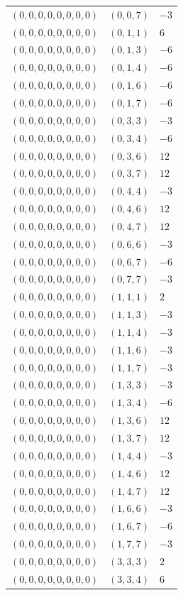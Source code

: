 \begin{longtable}{@{}lll@{}}
$(0,0,0,0,0,0,0,0)$ & $(0,0,7)$ & $-3$\\
$(0,0,0,0,0,0,0,0)$ & $(0,1,1)$ & $6$\\
$(0,0,0,0,0,0,0,0)$ & $(0,1,3)$ & $-6$\\
$(0,0,0,0,0,0,0,0)$ & $(0,1,4)$ & $-6$\\
$(0,0,0,0,0,0,0,0)$ & $(0,1,6)$ & $-6$\\
$(0,0,0,0,0,0,0,0)$ & $(0,1,7)$ & $-6$\\
$(0,0,0,0,0,0,0,0)$ & $(0,3,3)$ & $-3$\\
$(0,0,0,0,0,0,0,0)$ & $(0,3,4)$ & $-6$\\
$(0,0,0,0,0,0,0,0)$ & $(0,3,6)$ & $12$\\
$(0,0,0,0,0,0,0,0)$ & $(0,3,7)$ & $12$\\
$(0,0,0,0,0,0,0,0)$ & $(0,4,4)$ & $-3$\\
$(0,0,0,0,0,0,0,0)$ & $(0,4,6)$ & $12$\\
$(0,0,0,0,0,0,0,0)$ & $(0,4,7)$ & $12$\\
$(0,0,0,0,0,0,0,0)$ & $(0,6,6)$ & $-3$\\
$(0,0,0,0,0,0,0,0)$ & $(0,6,7)$ & $-6$\\
$(0,0,0,0,0,0,0,0)$ & $(0,7,7)$ & $-3$\\
$(0,0,0,0,0,0,0,0)$ & $(1,1,1)$ & $2$\\
$(0,0,0,0,0,0,0,0)$ & $(1,1,3)$ & $-3$\\
$(0,0,0,0,0,0,0,0)$ & $(1,1,4)$ & $-3$\\
$(0,0,0,0,0,0,0,0)$ & $(1,1,6)$ & $-3$\\
$(0,0,0,0,0,0,0,0)$ & $(1,1,7)$ & $-3$\\
$(0,0,0,0,0,0,0,0)$ & $(1,3,3)$ & $-3$\\
$(0,0,0,0,0,0,0,0)$ & $(1,3,4)$ & $-6$\\
$(0,0,0,0,0,0,0,0)$ & $(1,3,6)$ & $12$\\
$(0,0,0,0,0,0,0,0)$ & $(1,3,7)$ & $12$\\
$(0,0,0,0,0,0,0,0)$ & $(1,4,4)$ & $-3$\\
$(0,0,0,0,0,0,0,0)$ & $(1,4,6)$ & $12$\\
$(0,0,0,0,0,0,0,0)$ & $(1,4,7)$ & $12$\\
$(0,0,0,0,0,0,0,0)$ & $(1,6,6)$ & $-3$\\
$(0,0,0,0,0,0,0,0)$ & $(1,6,7)$ & $-6$\\
$(0,0,0,0,0,0,0,0)$ & $(1,7,7)$ & $-3$\\
$(0,0,0,0,0,0,0,0)$ & $(3,3,3)$ & $2$\\
$(0,0,0,0,0,0,0,0)$ & $(3,3,4)$ & $6$\\

\end{longtable}
